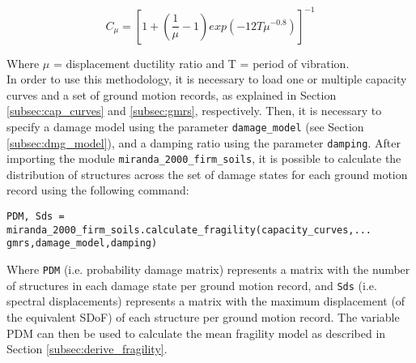 \begin{equation}
C_\mu = \left[1+\left(\frac{1}{\mu}-1\right)exp\left(-12T\mu^{-0.8}\right)\right]^{-1}
\end{equation}

Where $\mu$ = displacement ductility ratio and T = period of vibration.\\
In order to use this methodology, it is necessary to load one or multiple capacity curves and a set of ground motion records, as explained in Section \ref{subsec:cap_curves} and \ref{subsec:gmrs}, respectively. Then, it is necessary to specify a damage model using the parameter \verb=damage_model= (see Section \ref{subsec:dmg_model}), and a damping ratio using the parameter \verb=damping=. After importing the module \verb=miranda_2000_firm_soils=, it is possible to calculate the distribution of structures across the set of damage states for each ground motion record using the following command:

\begin{Verbatim}[frame=single, commandchars=\\\{\}, samepage=true]
PDM, Sds = miranda_2000_firm_soils.calculate_fragility(capacity_curves,...
gmrs,damage_model,damping)
\end{Verbatim}

Where \verb=PDM= (i.e. probability damage matrix) represents a matrix with the number of structures in each damage state per ground motion record, and \verb=Sds= (i.e. spectral displacements) represents a matrix with the maximum displacement (of the equivalent SDoF) of each structure per ground motion record. The variable PDM can then be used to calculate the mean fragility model as described in Section \ref{subsec:derive_fragility}.